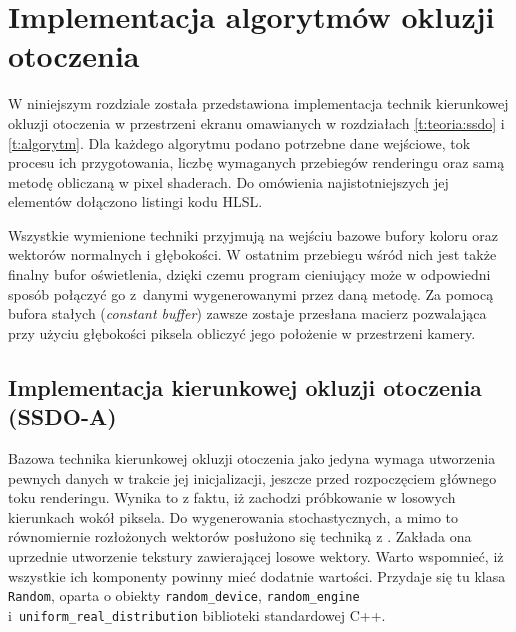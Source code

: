 \chapter{Implementacja algorytmów okluzji otoczenia}
\label{t:impl}

	
	W niniejszym rozdziale została przedstawiona implementacja technik kierunkowej okluzji otoczenia w przestrzeni ekranu omawianych w rozdziałach \ref{t:teoria:ssdo} i \ref{t:algorytm}. Dla każdego algorytmu podano potrzebne dane wejściowe, tok procesu ich przygotowania, liczbę wymaganych przebiegów renderingu oraz samą metodę obliczaną w pixel shaderach. Do omówienia najistotniejszych jej elementów dołączono listingi kodu HLSL.
	
	Wszystkie wymienione techniki przyjmują na wejściu bazowe bufory koloru oraz wektorów normalnych i głębokości. W ostatnim przebiegu wśród nich jest także finalny bufor oświetlenia, dzięki czemu program cieniujący może w odpowiedni sposób połączyć go z~danymi wygenerowanymi przez daną metodę. Za pomocą bufora stałych (\emph{constant buffer}) zawsze zostaje przesłana macierz pozwalająca przy użyciu głębokości piksela obliczyć jego położenie w przestrzeni kamery.
	
	\section{Implementacja kierunkowej okluzji otoczenia (SSDO-A)}
	\label{t:impl:a}
	
	
	
	Bazowa technika kierunkowej okluzji otoczenia jako jedyna wymaga utworzenia pewnych danych w trakcie jej inicjalizacji, jeszcze przed rozpoczęciem głównego toku renderingu. Wynika to z faktu, iż zachodzi próbkowanie w losowych kierunkach wokół piksela. Do wygenerowania stochastycznych, a mimo to równomiernie rozłożonych wektorów posłużono się techniką z \cite{luna}. Zakłada ona uprzednie utworzenie tekstury zawierającej losowe wektory. Warto wspomnieć, iż wszystkie ich komponenty powinny mieć dodatnie wartości. Przydaje się tu klasa \texttt{Random}, oparta o obiekty \texttt{random\_device}, \texttt{random\_engine} i~\texttt{uniform\_real\_distribution} biblioteki standardowej C++.
	

